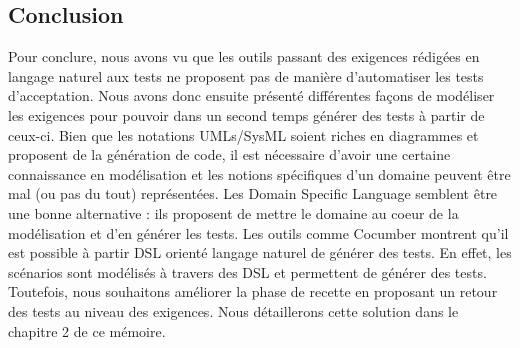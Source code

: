     \subsection{Conclusion}
    Pour conclure, nous avons vu que les outils passant des exigences rédigées en langage naturel aux tests ne proposent pas de manière d'automatiser les tests d'acceptation. Nous avons donc ensuite présenté différentes façons de modéliser les exigences pour pouvoir dans un second temps générer des tests à partir de ceux-ci. Bien que les notations UMLs/SysML soient riches en diagrammes et proposent de la génération de code, il est nécessaire d'avoir une certaine connaissance en modélisation et les notions spécifiques d'un domaine peuvent être mal (ou pas du tout) représentées. Les Domain Specific Language semblent être une bonne alternative : ils proposent de mettre le domaine au coeur de la modélisation et d'en générer les tests. Les outils comme Cocumber montrent qu'il est possible à partir DSL orienté langage naturel de générer des tests. En effet, les scénarios sont modélisés à travers des DSL et permettent de générer des tests. Toutefois, nous souhaitons améliorer la phase de recette en proposant un retour des tests au niveau des exigences. Nous détaillerons cette solution dans le chapitre 2 de ce mémoire. 


